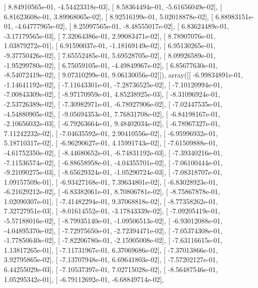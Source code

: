\documentclass{article}
\begin{document}
       [  8.84910565e-01,  -4.54423318e-03],
       [  8.58364494e-01,  -5.61656049e-02],
       [  6.81623608e-01,   3.89968065e-02],
       [  8.92516199e-01,   5.02018878e-02],
       [  6.88983151e-01,  -4.64777965e-02],
       [  8.25997565e-01,  -8.48555017e-02],
       [  6.83624489e-01,  -3.17179565e-03],
       [  7.32064386e-01,   2.99083471e-02],
       [  8.78907076e-01,   1.03879272e-01],
       [  6.91590037e-01,  -1.18169149e-02],
       [  6.95130265e-01,  -9.37750426e-02],
       [  7.65552485e-01,   5.69528705e-02],
       [  8.09926589e-01,  -1.95299780e-02],
       [  6.75059105e-01,  -4.49849967e-02],
       [  6.85677630e-01,  -8.54072419e-02],
       [  9.07310299e-01,   9.06130056e-02]]), array([[ -6.99834891e-01,  -1.14641192e-02],
       [ -7.11643301e-01,  -7.28736525e-02],
       [ -7.10120994e-01,  -7.00843309e-02],
       [ -8.97170959e-01,   4.85238925e-03],
       [ -8.31096924e-01,  -2.53726389e-02],
       [ -7.30982971e-01,  -6.78927906e-02],
       [ -7.02447535e-01,  -4.54880905e-02],
       [ -9.05694353e-01,   7.76831708e-02],
       [ -6.84198167e-01,  -2.10656032e-03],
       [ -6.79263664e-01,   9.48402034e-02],
       [ -6.78967327e-01,   7.11242232e-02],
       [ -7.04635592e-01,   2.90410556e-02],
       [ -6.95996932e-01,   5.18710317e-02],
       [ -6.96290627e-01,   4.15991743e-02],
       [ -7.61509888e-01,  -4.61752350e-02],
       [ -8.44680652e-01,  -6.74831192e-03],
       [ -7.39340216e-01,  -7.11536574e-02],
       [ -6.88658958e-01,  -4.04355701e-02],
       [ -7.06100444e-01,  -9.21090275e-03],
       [ -8.65629324e-01,  -1.05290724e-03],
       [ -7.08318707e-01,   1.09157509e-01],
       [ -6.93427168e-01,   7.39634801e-02],
       [ -6.83028923e-01,  -6.21629212e-02],
       [ -6.83382061e-01,   8.70806781e-02],
       [ -8.75867878e-01,   1.02090307e-01],
       [ -7.41482294e-01,   9.37068818e-02],
       [ -8.77358262e-01,   7.32727951e-03],
       [ -8.01614552e-01,  -3.17843339e-02],
       [ -7.09205419e-01,  -5.57188016e-02],
       [ -8.79935140e-01,  -1.09506513e-02],
       [ -6.93012088e-01,  -4.04895370e-02],
       [ -7.72975650e-01,  -2.72394471e-02],
       [ -7.05374308e-01,  -1.77850640e-02],
       [ -7.82206780e-01,  -2.15905008e-02],
       [ -7.63116615e-01,   1.13817265e-01],
       [ -7.11731967e-01,   6.37069686e-02],
       [ -7.37013866e-01,   3.92795865e-02],
       [ -7.13707948e-01,   6.69641803e-02],
       [ -7.57202127e-01,   6.44255029e-03],
       [ -7.10537397e-01,   7.02715028e-02],
       [ -8.56487546e-01,   1.05295342e-01],
       [ -6.79112692e-01,  -6.68849714e-02],
\end{document}
